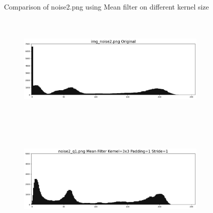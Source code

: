 \documentclass[12pt,a4paper]{report}
\begin{document}
\begin{figure}[!htb]
\begin{minipage}{\linewidth}
  \caption{Comparison of noise2.png using Mean filter on different kernel size}
  \end{minipage}

\end{figure}
\begin{figure}[!htb]
  \begin{minipage}{\linewidth}
    \centering
    \begin{subfigure}{1\textwidth}
      \includegraphics[height=5.3cm]{result_img/noise2_his.png}
    \end{subfigure}
    \begin{subfigure}{1\textwidth}
      \includegraphics[height=5.3cm]{output/noise2_q1_K3P1_his.png}
    \end{subfigure}


\end{minipage}
\end{figure}
\end{document}
